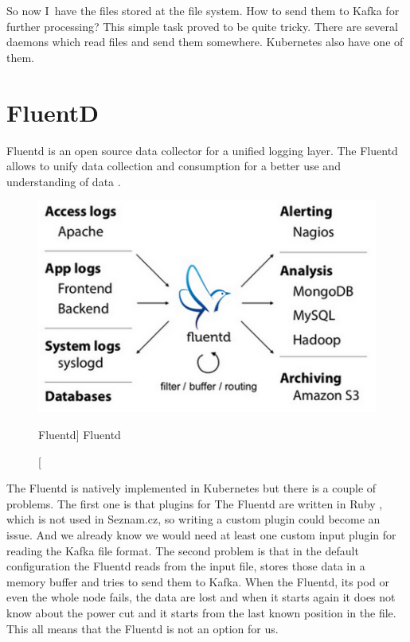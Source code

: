 So now I~have the files stored at the file system. How to send them to Kafka for further processing? This simple task proved to be quite tricky. There are several daemons which read files and send them somewhere. Kubernetes also have one of them.

\section{FluentD}

Fluentd is an open source data collector for a unified logging layer. The Fluentd allows to unify data collection and consumption for a better use and understanding of data \cite{fluentd}.

\begin{figure}[htb]\centering
  \includegraphics[width=1\textwidth]{images/fluentd-architecture.png}
  \caption
    [Fluentd]
    {Fluentd \cite{fluentd}}
  \label{fig:fluentd}
\end{figure}
 
The Fluentd is natively implemented in Kubernetes but there is a couple of problems. The first one is that plugins for The Fluentd are written in Ruby \cite{ruby}, which is not used in Seznam.cz, so writing a custom plugin could become an issue. And we already know we would need at least one custom input plugin for reading the Kafka file format. The second problem is that in the default configuration the Fluentd reads from the input file, stores those data in a memory buffer and tries to send them to Kafka. When the Fluentd, its pod or even the whole node fails, the data are lost and when it starts again it does not know about the power cut and it starts from the last known position in the file. This all means that the Fluentd is not an option for us.

